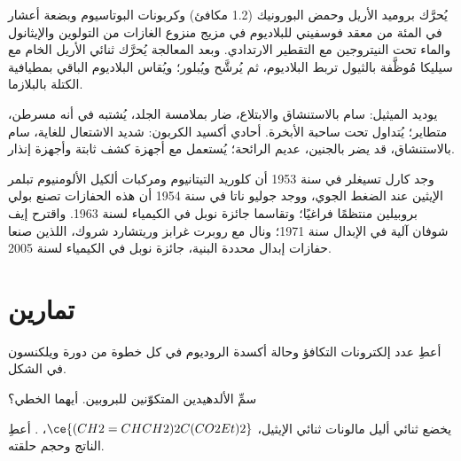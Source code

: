 \begin{inthelab}
يُحرَّك بروميد الأريل وحمض البورونيك (1.2 مكافئ) وكربونات البوتاسيوم 
وبضعة أعشار في المئة من معقد فوسفيني للبلاديوم في
مزيج منزوع الغازات من التولوين والإيثانول والماء تحت النيتروجين مع التقطير الارتدادي. وبعد
المعالجة يُحرَّك ثنائي الأريل الخام مع سيليكا مُوظَّفة بالثيول
تربط البلاديوم، ثم يُرشَّح ويُبلور؛ ويُقاس البلاديوم الباقي بمطيافية
الكتلة بالبلازما.
\end{inthelab}

\begin{safety}{}
يوديد الميثيل: سام بالاستنشاق والابتلاع، ضار بملامسة الجلد، يُشتبه في أنه
مسرطن، متطاير؛ يُتداول تحت ساحبة الأبخرة. أحادي أكسيد الكربون: شديد
الاشتعال للغاية، سام بالاستنشاق، قد يضر بالجنين، عديم الرائحة؛ يُستعمل
مع أجهزة كشف ثابتة وأجهزة إنذار.
\end{safety}

\begin{history}
وجد كارل تسيغلر في سنة 1953 أن كلوريد التيتانيوم ومركبات ألكيل الألومنيوم
تبلمر الإيثين عند الضغط الجوي، ووجد جوليو ناتا في سنة 1954 أن هذه
الحفازات تصنع بولي بروبيلين منتظمًا فراغيًا؛ وتقاسما جائزة نوبل في
الكيمياء لسنة 1963. واقترح إيف شوفان آلية  في
الإبدال سنة 1971؛ ونال مع روبرت غرابز وريتشارد شروك، اللذين صنعا حفازات
إبدال محددة البنية، جائزة نوبل في الكيمياء لسنة 2005.
\end{history}

\section{تمارين}

\begin{exercise}[$\star$]\label{exo:b3:homogeneous-catalysis:1}
أعطِ عدد إلكترونات التكافؤ وحالة أكسدة الروديوم في كل خطوة
من دورة ويلكنسون في الشكل.
\end{exercise}

\begin{exercise}[$\star$]\label{exo:b3:homogeneous-catalysis:2}
سمِّ الألدهيدين المتكوّنين  للبروبين. أيهما
الخطي؟
\end{exercise}

\begin{exercise}[$\star$]\label{exo:b3:homogeneous-catalysis:3}
يخضع ثنائي أليل مالونات ثنائي الإيثيل، $\ce{(CH2=CHCH2)2C(CO2Et)2}$، .
أعطِ الناتج وحجم حلقته.
\end{exercise}

